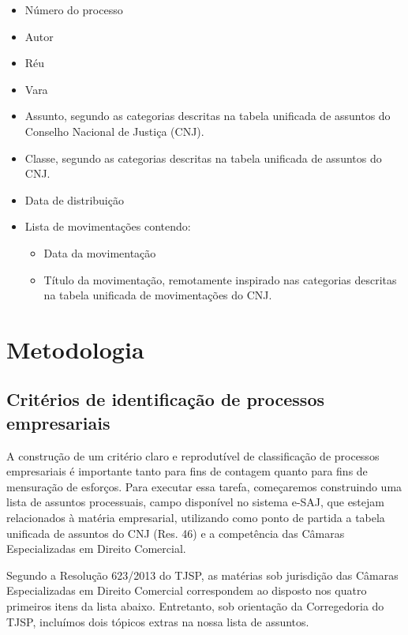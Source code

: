 \documentclass[]{book}
\providecommand{\tightlist}{%
  \setlength{\itemsep}{0pt}\setlength{\parskip}{0pt}}
\begin{document}
\begin{itemize}
\tightlist
\item
  Número do processo
\item
  Autor
\item
  Réu
\item
  Vara
\item
  Assunto, segundo as categorias descritas na tabela unificada de
  assuntos do Conselho Nacional de Justiça (CNJ).
\item
  Classe, segundo as categorias descritas na tabela unificada de
  assuntos do CNJ.
\item
  Data de distribuição
\item
  Lista de movimentações contendo:

  \begin{itemize}
  \tightlist
  \item
    Data da movimentação
  \item
    Título da movimentação, remotamente inspirado nas categorias
    descritas na tabela unificada de movimentações do CNJ.
  \end{itemize}
\end{itemize}

\chapter{Metodologia}\label{metodologia}

\section{Critérios de identificação de processos
empresariais}\label{criterios-de-identificacao-de-processos-empresariais}

A construção de um critério claro e reprodutível de classificação de
processos empresariais é importante tanto para fins de contagem quanto
para fins de mensuração de esforços. Para executar essa tarefa,
começaremos construindo uma lista de assuntos processuais, campo
disponível no sistema e-SAJ, que estejam relacionados à matéria
empresarial, utilizando como ponto de partida a tabela unificada de
assuntos do CNJ (Res. 46) e a competência das Câmaras Especializadas em
Direito Comercial.

Segundo a Resolução 623/2013 do TJSP, as matérias sob jurisdição das
Câmaras Especializadas em Direito Comercial correspondem ao disposto nos
quatro primeiros itens da lista abaixo. Entretanto, sob orientação da
Corregedoria do TJSP, incluímos dois tópicos extras na nossa lista de
assuntos.
\end{document}
